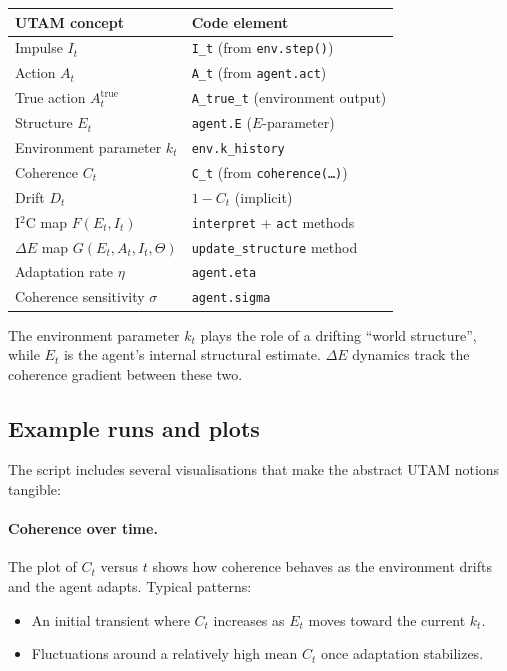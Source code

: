 \documentclass[12pt,a4paper]{report}
\begin{document}
\begin{center}
\begin{tabular}{ll}
\toprule
\textbf{UTAM concept} & \textbf{Code element} \\
\midrule
Impulse \(I_t\) & \texttt{I\_t} (from \texttt{env.step()}) \\
Action \(A_t\) & \texttt{A\_t} (from \texttt{agent.act}) \\
True action \(A^{\mathrm{true}}_t\) & \texttt{A\_true\_t} (environment output) \\
Structure \(E_t\) & \texttt{agent.E} (\(E\)-parameter) \\
Environment parameter \(k_t\) & \texttt{env.k\_history} \\
Coherence \(C_t\) & \texttt{C\_t} (from \texttt{coherence(\dots)}) \\
Drift \(D_t\) & \(1 - C_t\) (implicit) \\
I$^2$C map \(F(E_t, I_t)\) & \texttt{interpret} + \texttt{act} methods \\
$\Delta E$ map \(G(E_t, A_t, I_t, \Theta)\) & \texttt{update\_structure} method \\
Adaptation rate \(\eta\) & \texttt{agent.eta} \\
Coherence sensitivity \(\sigma\) & \texttt{agent.sigma} \\
\bottomrule
\end{tabular}
\end{center}

The environment parameter \(k_t\) plays the role of a drifting ``world structure'', while \(E_t\) is the agent's internal structural estimate. $\Delta E$ dynamics track the coherence gradient between these two.

\subsection*{Example runs and plots}

The script includes several visualisations that make the abstract UTAM notions tangible:

\paragraph{Coherence over time.}

The plot of \(C_t\) versus \(t\) shows how coherence behaves as the environment drifts and the agent adapts. Typical patterns:

\begin{itemize}[leftmargin=2em]
    \item An initial transient where \(C_t\) increases as \(E_t\) moves toward the current \(k_t\).
    \item Fluctuations around a relatively high mean \(C_t\) once adaptation stabilizes.
\end{itemize}
\end{document}
